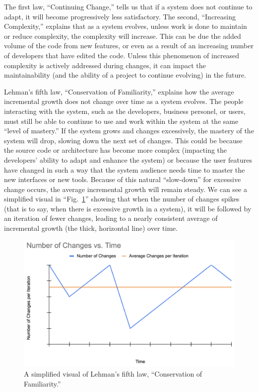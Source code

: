 \documentclass[12pt,conference]{IEEEtran}
\begin{document}
The first law, ``Continuing Change,'' tells us that if a system does not continue to adapt, it will become progressively less satisfactory. The second, ``Increasing Complexity,'' explains that as a system evolves, unless work is done to maintain or reduce complexity, the complexity will increase. This can be due the added volume of the code from new features, or even as a result of an increasing number of developers that have edited the code. Unless this phenomenon of increased complexity is actively addressed during changes, it can impact the maintainability (and the ability of a project to continue evolving) in the future.

Lehman's fifth law, ``Conservation of Familiarity,'' explains how the average incremental growth does not change over time as a system evolves. The people interacting with the system, such as the developers, business personel, or users, must still be able to continue to use and work within the system at the same ``level of mastery.'' If the system grows and changes excessively, the mastery of the system will drop, slowing down the next set of changes. This could be because the source code or architecture has become more complex (impacting the developers' ability to adapt and enhance the system) or because the user features have changed in such a way that the system audience needs time to master the new interfaces or new tools. Because of this natural ``slow-down'' for excessive change occurs, the average incremental growth will remain steady. We can see a simplified visual in ``Fig.~\ref{figConservationOfFamiliarity}'' showing that when the number of changes spikes (that is to say, when there is excessive growth in a system), it will be followed by an iteration of fewer changes, leading to a nearly consistent average of incremental growth (the thick, horizontal line) over time.

\begin{figure}[ht]
    \centerline{
        \includegraphics[width=\columnwidth]{Changes-vs-Time}
    }
    \caption{A simplified visual of Lehman's fifth law, ``Conservation of Familiarity.''}
    \label{figConservationOfFamiliarity}
\end{figure}
\end{document}
